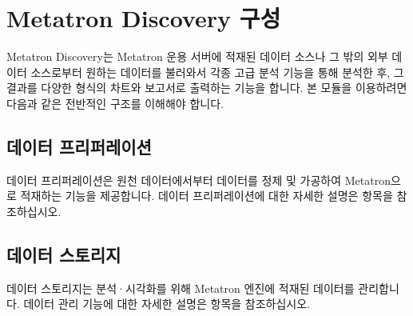 \documentclass[letterpaper,10pt,english]{sphinxmanual}
\begin{document}
\section{Metatron Discovery 구성}
\label{\detokenize{discovery/part01/structure:metatron-discovery}}\label{\detokenize{discovery/part01/structure::doc}}
Metatron Discovery는 Metatron 운용 서버에 적재된 데이터 소스나 그 밖의 외부 데이터 소스로부터 원하는 데이터를 불러와서 각종 고급 분석 기능을 통해 분석한 후, 그 결과를 다양한 형식의 차트와 보고서로 출력하는 기능을 합니다. 본 모듈을 이용하려면 다음과 같은 전반적인 구조를 이해해야 합니다.
\begin{quote}

\begin{figure}[H]
\centering

\noindent{}
\end{figure}
\end{quote}


\subsection{데이터 프리퍼레이션}
\label{\detokenize{discovery/part01/structure:id1}}
데이터 프리퍼레이션은 원천 데이터에서부터 데이터를 정제 및 가공하여 Metatron으로 적재하는 기능을 제공합니다. 데이터 프리퍼레이션에 대한 자세한 설명은 {\hyperref[\detokenize{discovery/part07/index::doc}]{}} 항목을 참조하십시오.
\begin{quote}

\begin{figure}[H]
\centering

\noindent{}
\end{figure}

\begin{figure}[H]
\centering

\noindent{}
\end{figure}
\end{quote}


\subsection{데이터 스토리지}
\label{\detokenize{discovery/part01/structure:id2}}
데이터 스토리지는 분석·시각화를 위해 Metatron 엔진에 적재된 데이터를 관리합니다. 데이터 관리 기능에 대한 자세한 설명은 {\hyperref[\detokenize{discovery/part02/index::doc}]{}} 항목을 참조하십시오.
\begin{quote}

\begin{figure}[H]
\centering

\noindent{}
\end{figure}

\begin{figure}[H]
\centering

\noindent{}
\end{figure}
\end{quote}
\end{document}
